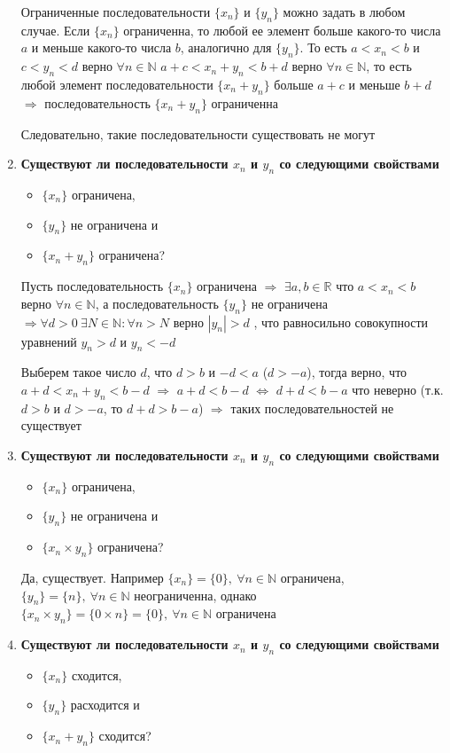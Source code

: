 \documentclass[a4paper,12pt]{article}
\begin{document}
\begin{enumerate}
{      Ограниченные последовательности $\{x_n\}$ и $\{y_n\}$ можно задать в любом случае. Если $\{x_n\}$ ограниченна,
      то любой ее элемент больше какого-то числа $a$ и меньше какого-то числа $b$, аналогично для $\{y_n\}$.
      То есть $a < x_n < b$ и $c < y_n < d$ верно $\forall n \in \mathbb{N}$
      $a + c < x_n + y_n < b + d$ верно $\forall n \in \mathbb{N}$, то есть любой элемент
      последовательности $\{x_n + y_n\}$ больше $a + c$ и меньше $b + d$ $\Rightarrow$
      последовательность $\{x_n + y_n\}$ ограниченна

      Следовательно, такие последовательности существовать не могут
    }
    \item {
      \textbf{Существуют ли последовательности $x_n$ и $y_n$ со следующими свойствами}
      \begin{itemize}
        \item $\{x_n\}$ ограничена,
        \item $\{y_n\}$ не ограничена и
        \item $\{x_n + y_n\}$ ограничена?
      \end{itemize}

      Пусть последовательность $\{x_n\}$ ограничена $\Rightarrow$ $\exists a,b \in \mathbb{R}$ что
      $a < x_n < b$ верно $\forall n \in \mathbb{N}$, а последовательность $\{y_n\}$ не
      ограничена $\Rightarrow \forall d > 0 \: \exists N \in \mathbb{N}: \forall n > N$ верно $|y_n| > d$
      , что равносильно совокупности уравнений $y_n > d$ и $y_n < -d$

      Выберем такое число $d$, что $d > b$ и $-d < a$ ($d > -a$), тогда верно, что
      $a + d < x_n + y_n < b - d$ $\Rightarrow$ $a + d < b - d$ $\Leftrightarrow$
      $d + d < b - a$ что неверно (т.к. $d > b$ и $d > -a$, то $d + d > b - a$)
      $\Rightarrow$ таких последовательностей не существует
    }
    \item {
      \textbf{Существуют ли последовательности $x_n$ и $y_n$ со следующими свойствами}
      \begin{itemize}
        \item $\{x_n\}$ ограничена,
        \item $\{y_n\}$ не ограничена и
        \item $\{x_n \times y_n\}$ ограничена?
      \end{itemize}

      Да, существует. Например $\{x_n\} = \{0\}, \: \forall n \in \mathbb{N}$ ограничена, $\{y_n\} = \{n\}, \: \forall n \in \mathbb{N}$
      неограниченна, однако $\{x_n\times y_n\} = \{0 \times n\} = \{0\}, \: \forall n \in \mathbb{N}$ ограничена
    }
    \item {
      \textbf{Существуют ли последовательности $x_n$ и $y_n$ со следующими свойствами}
      \begin{itemize}
        \item $\{x_n\}$ сходится,
        \item $\{y_n\}$ расходится и
        \item $\{x_n + y_n\}$ сходится?
      \end{itemize}

}
\end{enumerate}
\end{document}
